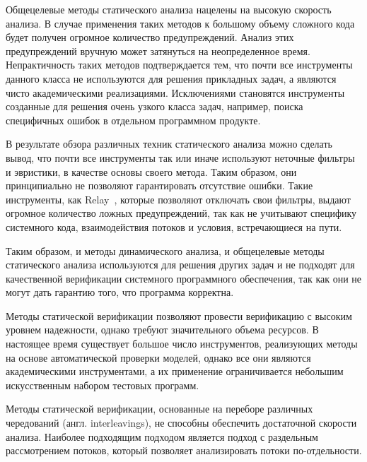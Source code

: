 Общецелевые методы статического анализа нацелены на высокую скорость анализа.
В случае применения таких методов к большому объему сложного кода будет получен огромное количество предупреждений.
Анализ этих предупреждений вручную может затянуться на неопределенное время.
Непрактичность таких методов подтверждается тем, что почти все инструменты данного класса не используются для решения прикладных задач, а являются чисто академическими реализациями. 
Исключениями становятся инструменты созданные для решения очень узкого класса задач, например, поиска специфичных ошибок в отдельном программном продукте.

В результате обзора различных техник статического анализа можно сделать вывод, что почти все инструменты так или иначе используют неточные фильтры и эвристики, в качестве основы своего метода.
Таким образом, они принципиально не позволяют гарантировать отсутствие ошибки.
Такие инструменты, как Relay~\cite{Relay}, которые позволяют отключать свои фильтры, выдают огромное количество ложных предупреждений, так как не учитывают специфику системного кода, взаимодействия потоков и условия, встречающиеся на пути.

Таким образом, и методы динамического анализа, и общецелевые методы статического анализа используются для решения других задач и не подходят для качественной верификации системного программного обеспечения, так как они не могут дать гарантию того, что программа корректна.

Методы статической верификации позволяют провести верификацию с высоким уровнем надежности, однако требуют значительного объема ресурсов. 
В настоящее время существует большое число инструментов, реализующих методы на основе автоматической проверки моделей, однако все они являются академическими инструментами, а их применение ограничивается небольшим искусственным набором тестовых программ.

Методы статической верификации, основанные на переборе различных чередований (англ. interleavings), не способны обеспечить достаточной скорости анализа. 
Наиболее подходящим подходом является подход с раздельным рассмотрением потоков, который позволяет анализировать потоки по-отдельности. 

